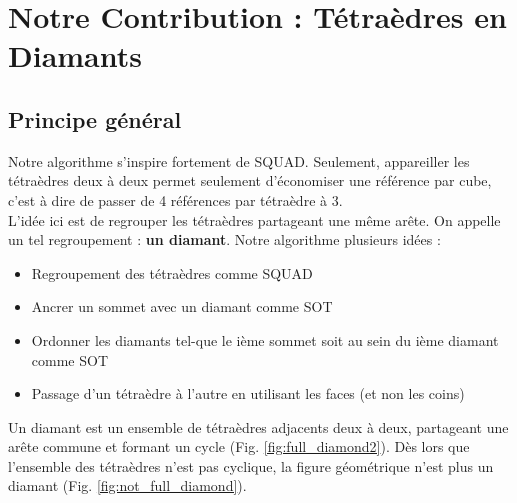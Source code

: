 \section{Notre Contribution : Tétraèdres en Diamants}
\subsection{Principe général}
\noindent
Notre algorithme s'inspire fortement de SQUAD. Seulement, appareiller les tétraèdres deux à deux permet seulement d'économiser une référence par cube, c'est à dire de passer de 4 références par tétraèdre à 3.\\
L'idée ici est de regrouper les tétraèdres partageant une même arête. On appelle un tel regroupement : \textbf{un diamant}. Notre algorithme plusieurs idées :
\begin{itemize}
\item Regroupement des tétraèdres comme SQUAD
\item Ancrer un sommet avec un diamant comme SOT
\item Ordonner les diamants tel-que le ième sommet soit au sein du ième diamant comme SOT
\item Passage d'un tétraèdre à l'autre en utilisant les faces (et non les coins)\\
\end{itemize}
Un diamant est un ensemble de tétraèdres adjacents deux à deux, partageant une arête commune et formant un cycle (Fig. \ref{fig:full_diamond2}). Dès lors que l'ensemble des tétraèdres n'est pas cyclique, la figure géométrique n'est plus un diamant (Fig. \ref{fig:not_full_diamond}).
